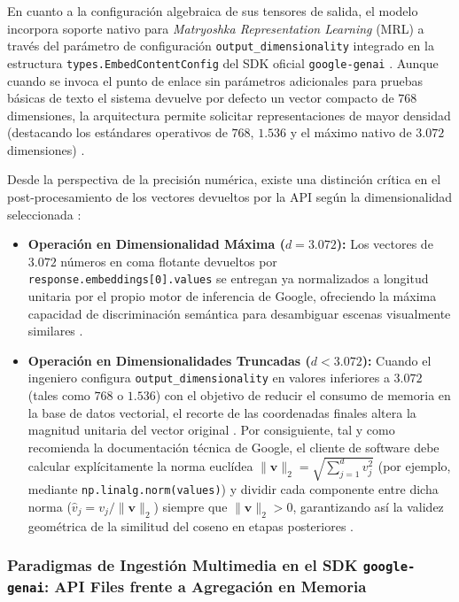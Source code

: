 En cuanto a la configuración algebraica de sus tensores de salida, el modelo incorpora soporte nativo para \textit{Matryoshka Representation Learning} (MRL) a través del parámetro de configuración \texttt{output\_dimensionality} integrado en la estructura \texttt{types.EmbedContentConfig} del SDK oficial \texttt{google-genai} \cite{gemini_emb2_docs}. %
Aunque cuando se invoca el punto de enlace sin parámetros adicionales para pruebas básicas de texto el sistema devuelve por defecto un vector compacto de $768$ dimensiones, la arquitectura permite solicitar representaciones de mayor densidad (destacando los estándares operativos de $768$, $1.536$ y el máximo nativo de $3.072$ dimensiones) \cite{gemini_emb2_docs}. %

Desde la perspectiva de la precisión numérica, existe una distinción crítica en el post-procesamiento de los vectores devueltos por la API según la dimensionalidad seleccionada \cite{gemini_emb2_docs}: %
\begin{itemize}
    \item \textbf{Operación en Dimensionalidad Máxima ($d = 3.072$):} Los vectores de $3.072$ números en coma flotante devueltos por \texttt{response.embeddings[0].values} se entregan ya normalizados a longitud unitaria por el propio motor de inferencia de Google, ofreciendo la máxima capacidad de discriminación semántica para desambiguar escenas visualmente similares \cite{gemini_emb2_docs}. %
    \item \textbf{Operación en Dimensionalidades Truncadas ($d < 3.072$):} Cuando el ingeniero configura \texttt{output\_dimensionality} en valores inferiores a $3.072$ (tales como $768$ o $1.536$) con el objetivo de reducir el consumo de memoria en la base de datos vectorial, el recorte de las coordenadas finales altera la magnitud unitaria del vector original \cite{gemini_emb2_docs}. %
    Por consiguiente, tal y como recomienda la documentación técnica de Google, el cliente de software debe calcular explícitamente la norma euclídea $\|\mathbf{v}\|_2 = \sqrt{\sum_{j=1}^{d} v_j^2}$ (por ejemplo, mediante \texttt{np.linalg.norm(values)}) y dividir cada componente entre dicha norma ($\hat{v}_j = v_j / \|\mathbf{v}\|_2$) siempre que $\|\mathbf{v}\|_2 > 0$, garantizando así la validez geométrica de la similitud del coseno en etapas posteriores \cite{gemini_emb2_docs}. %
\end{itemize}

\subsubsection{Paradigmas de Ingestión Multimedia en el SDK \texttt{google-genai}: API Files frente a Agregación en Memoria}
\label{subsubsec:paradigmas_ingestion_genai}

